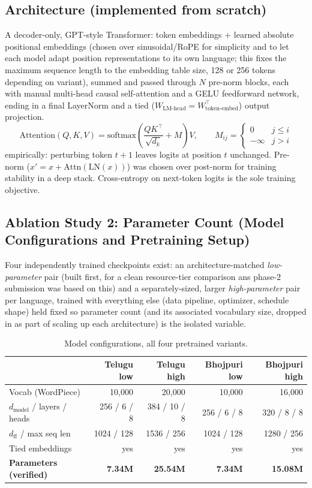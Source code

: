 \documentclass[10pt,a4paper]{article}
\begin{document}
\subsection{Architecture (implemented from scratch)}
A decoder-only, GPT-style Transformer: token embeddings + learned absolute positional
embeddings (chosen over sinusoidal/RoPE for simplicity and to let each model adapt position
representations to its own language; this fixes the maximum sequence length to the embedding
table size, 128 or 256 tokens depending on variant), summed and passed through $N$ pre-norm
blocks, each with manual multi-head causal self-attention and a GELU feedforward network, ending
in a final LayerNorm and a tied ($W_{\text{LM-head}} = W_{\text{token-embed}}^\top$) output
projection.
\vspace{-2pt}
\[
\text{Attention}(Q,K,V) = \text{softmax}\!\left(\frac{QK^\top}{\sqrt{d_k}} + M\right)V,
\qquad M_{ij} = \begin{cases}0 & j \le i\\ -\infty & j > i\end{cases}
\]
empirically: perturbing token $t{+}1$ leaves logits at position $t$ unchanged. Pre-norm
($x' = x + \text{Attn}(\text{LN}(x))$) was chosen over post-norm for training stability in a
deep stack. Cross-entropy on next-token logits is the sole training objective.

\subsection{Ablation Study 2: Parameter Count (Model Configurations and Pretraining Setup)}
Four independently trained checkpoints exist: an architecture-matched \emph{low-parameter} pair
(built first, for a clean resource-tier comparison ans phase-2 submission was based on this) and a separately-sized, larger
\emph{high-parameter} pair per language, trained with everything else (data pipeline, optimizer,
schedule shape) held fixed so parameter count (and its associated vocabulary size, dropped in as part of scaling up each architecture) is the isolated variable.

\begin{table}[H]\centering\footnotesize
\begin{tabular}{lrrrr}
\toprule
 & Telugu low & Telugu high & Bhojpuri low & Bhojpuri high \\
\midrule
Vocab (WordPiece) & 10,000 & 20,000 & 10,000 & 16,000 \\
$d_{\text{model}}$ / layers / heads & 256 / 6 / 8 & 384 / 10 / 8 & 256 / 6 / 8 & 320 / 8 / 8 \\
$d_{\text{ff}}$ / max seq len & 1024 / 128 & 1536 / 256 & 1024 / 128 & 1280 / 256 \\
Tied embeddings & yes & yes & yes & yes \\
\textbf{Parameters (verified)} & \textbf{7.34M} & \textbf{25.54M} & \textbf{7.34M} & \textbf{15.08M} \\
\bottomrule
\end{tabular}
\caption{Model configurations, all four pretrained variants.}
\end{table}
\vspace{-8pt}
\end{document}
